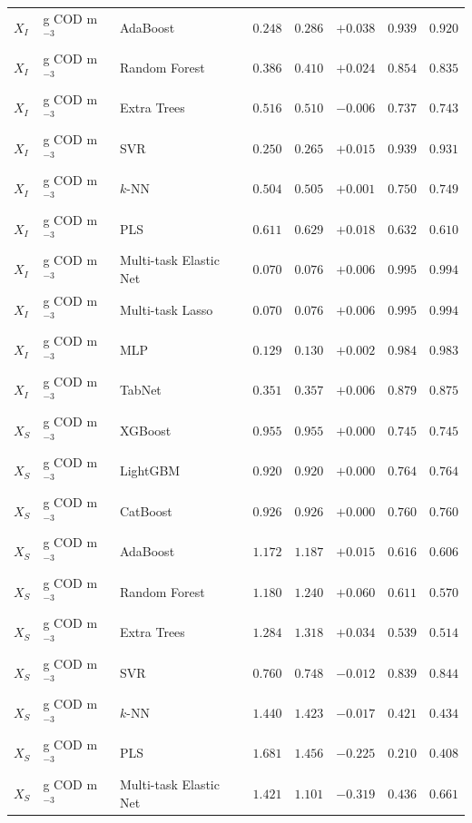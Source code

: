 \begin{longtable}{llp{3.1cm}rrrrr}
$X_{I}$ & g COD m$^{-3}$ & AdaBoost & $0.248$ & $0.286$ & $+0.038$ & $0.939$ & $0.920$ \\
$X_{I}$ & g COD m$^{-3}$ & Random Forest & $0.386$ & $0.410$ & $+0.024$ & $0.854$ & $0.835$ \\
$X_{I}$ & g COD m$^{-3}$ & Extra Trees & $0.516$ & $0.510$ & $-0.006$ & $0.737$ & $0.743$ \\
$X_{I}$ & g COD m$^{-3}$ & SVR & $0.250$ & $0.265$ & $+0.015$ & $0.939$ & $0.931$ \\
$X_{I}$ & g COD m$^{-3}$ & $k$-NN & $0.504$ & $0.505$ & $+0.001$ & $0.750$ & $0.749$ \\
$X_{I}$ & g COD m$^{-3}$ & PLS & $0.611$ & $0.629$ & $+0.018$ & $0.632$ & $0.610$ \\
$X_{I}$ & g COD m$^{-3}$ & Multi-task Elastic Net & $0.070$ & $0.076$ & $+0.006$ & $0.995$ & $0.994$ \\
$X_{I}$ & g COD m$^{-3}$ & Multi-task Lasso & $0.070$ & $0.076$ & $+0.006$ & $0.995$ & $0.994$ \\
$X_{I}$ & g COD m$^{-3}$ & MLP & $0.129$ & $0.130$ & $+0.002$ & $0.984$ & $0.983$ \\
$X_{I}$ & g COD m$^{-3}$ & TabNet & $0.351$ & $0.357$ & $+0.006$ & $0.879$ & $0.875$ \\
$X_{S}$ & g COD m$^{-3}$ & XGBoost & $0.955$ & $0.955$ & $+0.000$ & $0.745$ & $0.745$ \\
$X_{S}$ & g COD m$^{-3}$ & LightGBM & $0.920$ & $0.920$ & $+0.000$ & $0.764$ & $0.764$ \\
$X_{S}$ & g COD m$^{-3}$ & CatBoost & $0.926$ & $0.926$ & $+0.000$ & $0.760$ & $0.760$ \\
$X_{S}$ & g COD m$^{-3}$ & AdaBoost & $1.172$ & $1.187$ & $+0.015$ & $0.616$ & $0.606$ \\
$X_{S}$ & g COD m$^{-3}$ & Random Forest & $1.180$ & $1.240$ & $+0.060$ & $0.611$ & $0.570$ \\
$X_{S}$ & g COD m$^{-3}$ & Extra Trees & $1.284$ & $1.318$ & $+0.034$ & $0.539$ & $0.514$ \\
$X_{S}$ & g COD m$^{-3}$ & SVR & $0.760$ & $0.748$ & $-0.012$ & $0.839$ & $0.844$ \\
$X_{S}$ & g COD m$^{-3}$ & $k$-NN & $1.440$ & $1.423$ & $-0.017$ & $0.421$ & $0.434$ \\
$X_{S}$ & g COD m$^{-3}$ & PLS & $1.681$ & $1.456$ & $-0.225$ & $0.210$ & $0.408$ \\
$X_{S}$ & g COD m$^{-3}$ & Multi-task Elastic Net & $1.421$ & $1.101$ & $-0.319$ & $0.436$ & $0.661$ \\

\end{longtable}
